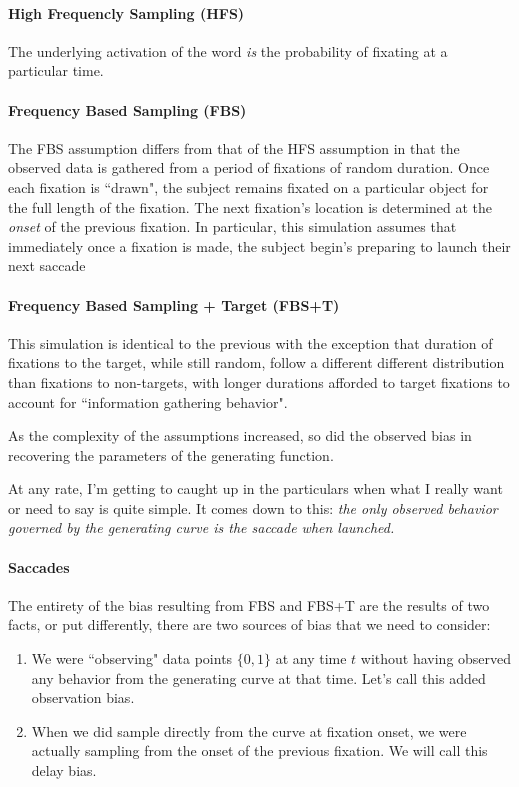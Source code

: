 \documentclass{article}
\begin{document}
\paragraph{High Frequencly Sampling (HFS)} The underlying activation of the word \textit{is} the probability of fixating at a particular time.

\paragraph{Frequency Based Sampling (FBS)} The FBS assumption differs from that of the HFS assumption in that the observed data is gathered from a period of fixations of random duration. Once each fixation is ``drawn", the subject remains fixated on a particular object for the full length of the fixation. The next fixation's location is determined at the \textit{onset} of the previous fixation. In particular, this simulation assumes that immediately once a fixation is made, the subject begin's preparing to launch their next saccade

\paragraph{Frequency Based Sampling + Target (FBS+T)} This simulation is identical to the previous with the exception that duration of fixations to the target, while still random, follow a different different distribution than fixations to non-targets, with longer durations afforded to target fixations to account for ``information gathering behavior". 

As the complexity of the assumptions increased, so did the observed bias in recovering the parameters of the generating function.

At any rate, I'm getting to caught up in the particulars when what I really want or need to say is quite simple. It comes down to this: \textit{the only observed behavior governed by the generating curve is the saccade when launched.} 


\paragraph{Saccades}

The entirety of the bias resulting from FBS and FBS+T are the results of two facts, or put differently, there are two sources of bias that we need to consider:

\begin{singlespace}
\begin{enumerate}
\item We were ``observing" data points $\{0,1\}$ at any time $t$ without having observed any behavior from the generating curve at that time. Let's call this added observation bias.
\item When we did sample directly from the curve at fixation onset, we were actually sampling from the onset of the previous fixation. We will call this delay bias.
\end{enumerate}
\end{singlespace}
\end{document}
